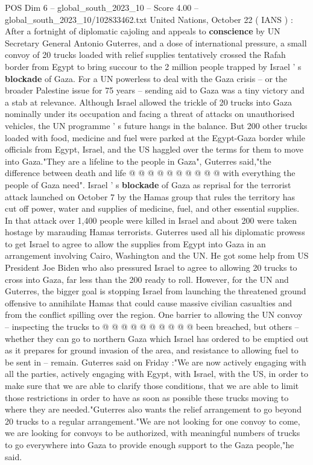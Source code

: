\begin{textsample}{POS Dim 6 – global\_south\_2023\_10 – Score 4.00 – global\_south\_2023\_10/102833462.txt}  \label{ex:f6_pos_244}
United Nations, October 22 ( IANS ) : After a fortnight of diplomatic cajoling and appeals to \textbf{conscience} by UN Secretary General Antonio Guterres, and a dose of international pressure, a small convoy of 20 trucks loaded with relief supplies tentatively crossed the Rafah border from Egypt to bring succour to the 2 million people trapped by Israel ' s \textbf{blockade} of Gaza.
For a UN powerless to deal with the Gaza crisis -- or the broader Palestine issue for 75 years -- sending aid to Gaza was a tiny victory and a stab at relevance.
Although Israel allowed the trickle of 20 trucks into Gaza nominally under its occupation and facing a threat of attacks on unauthorised vehicles, the UN programme ' s future hangs in the balance.
But 200 other trucks loaded with food, medicine and fuel were parked at the Egypt-Gaza border while officials from Egypt, Israel, and the US haggled over the terms for them to move into Gaza."They are a lifeline to the people in Gaza", Guterres said,"the difference between death and life @ @ @ @ @ @ @ @ @ @ with everything the people of Gaza need".
Israel ' s \textbf{blockade} of Gaza as reprisal for the terrorist attack launched on October 7 by the Hamas group that rules the territory has cut off power, water and supplies of medicine, fuel, and other essential supplies.
In that attack over 1,400 people were killed in Israel and about 200 were taken hostage by marauding Hamas terrorists.
Guterres used all his diplomatic prowess to get Israel to agree to allow the supplies from Egypt into Gaza in an arrangement involving Cairo, Washington and the UN.
He got some help from US President Joe Biden who also pressured Israel to agree to allowing 20 trucks to cross into Gaza, far less than the 200 ready to roll.
However, for the UN and Guterres, the bigger goal is stopping Israel from launching the threatened ground offensive to annihilate Hamas that could cause massive civilian casualties and from the conflict spilling over the region.
One barrier to allowing the UN convoy -- inspecting the trucks to @ @ @ @ @ @ @ @ @ @ been breached, but others -- whether they can go to northern Gaza which Israel has ordered to be emptied out as it prepares for ground invasion of the area, and resistance to allowing fuel to be sent in -- remain.
Guterres said on Friday :"We are now actively engaging with all the parties, actively engaging with Egypt, with Israel, with the US, in order to make sure that we are able to clarify those conditions, that we are able to limit those restrictions in order to have as soon as possible these trucks moving to where they are needed."Guterres also wants the relief arrangement to go beyond 20 trucks to a regular arrangement."We are not looking for one convoy to come, we are looking for convoys to be authorized, with meaningful numbers of trucks to go everywhere into Gaza to provide enough support to the Gaza people,"he said.

\end{textsample}
